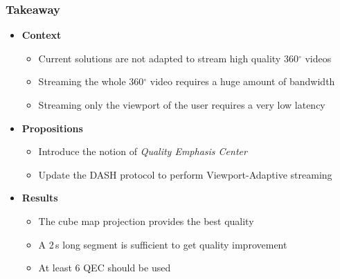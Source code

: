 \begin{frame}[c,label=Takeaway]
    \frametitle{Takeaway}
    \vfill
    \begin{itemize}[<+->]
        \item \textbf{Context}
        \begin{itemize}[<.->]
           \item Current solutions are not adapted to stream high quality 360$^{\circ}$ videos
           \item Streaming the whole 360$^{\circ}$ video requires a huge amount of bandwidth
           \item Streaming only the viewport of the user requires a very low latency
        \end{itemize}
    \end{itemize}
    \vfill
    \begin{itemize}[<+->]
        \item \textbf{Propositions}
        \begin{itemize}[<.->]
           \item Introduce the notion of \emph{Quality Emphasis Center}
           \item Update the DASH protocol to perform Viewport-Adaptive streaming
        \end{itemize}
    \end{itemize}

    \vfill
    \begin{itemize}[<+->]
        \item \textbf{Results}
        \begin{itemize}[<.->]
           \item The cube map projection provides the best quality
           \item A 2\,s long segment is sufficient to get quality improvement
           \item At least 6 QEC should be used
        \end{itemize}
    \end{itemize}
    \vfill
    \setcounter{totalTakeawaySlides}{\valueBP}
\end{frame}


